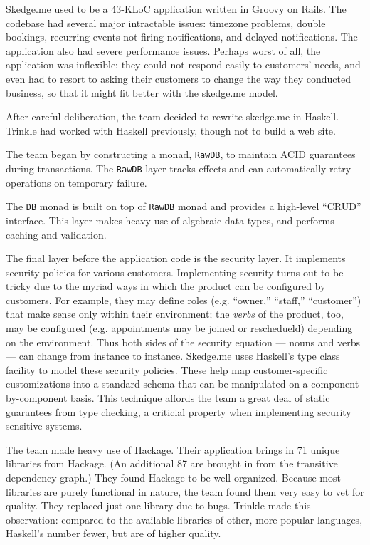 \documentclass{jfp1}
\begin{document}
Skedge.me used to be a 43-KLoC application written in Groovy on Rails.
The codebase had several major intractable issues: timezone problems,
double bookings, recurring events not firing notifications, and
delayed notifications. The application also had severe performance
issues. Perhaps worst of all, the application was inflexible: they
could not respond easily to customers' needs, and even had to resort to
asking their customers to change the way they conducted business, so
that it might fit better with the skedge.me model.

After careful deliberation, the team decided to rewrite skedge.me in 
Haskell. Trinkle had worked with Haskell previously, though not
to build a web site.

The team began by constructing a monad, \texttt{RawDB}, to maintain
ACID guarantees during transactions. The \texttt{RawDB} layer tracks
effects and can automatically retry operations on temporary failure.

The \texttt{DB} monad is built on top of \texttt{RawDB} monad and 
provides a high-level ``CRUD'' interface. This layer makes heavy 
use of algebraic data types, and performs caching and validation.

The final layer before the application code is the security layer. It
implements security policies for various customers. Implementing
security turns out to be tricky due to the myriad ways in which the
product can be configured by customers. For example, they may define
roles (e.g. ``owner,'' ``staff,'' ``customer'') that make sense only
within their environment; the \textit{verbs} of the product, too, may
be configured (e.g. appointments may be joined or reschedueld)
depending on the environment. Thus both sides of the security equation
--- nouns and verbs --- can change from instance to instance.
Skedge.me uses Haskell's type class facility to model these security
policies. These help map customer-specific customizations into a
standard schema that can be manipulated on a component-by-component
basis. This technique affords the team a great deal of static
guarantees from type checking, a criticial property when implementing
security sensitive systems.

The team made heavy use of Hackage. Their application brings in 
71 unique libraries from Hackage. (An additional 87 are brought in
from the transitive dependency graph.) They found Hackage to be 
well organized. Because most libraries are purely functional in nature,
the team found them very easy to vet for quality. They replaced just
one library due to bugs. Trinkle made this observation: compared to 
the available libraries of other, more popular languages, Haskell's 
number fewer, but are of higher quality.
\end{document}
